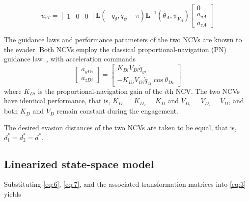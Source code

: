 \begin{equation}
\label{eq:8}
{u_{rT}} = \left[ {\begin{array}{*{20}{c}}
  1&0&0 
\end{array}} \right]{\mathbf{L}}( - {q_\theta },{q_\psi } - \pi ){{\mathbf{L}}^{ - 1}}({\theta _A},{\psi _{{V_A}}})\left[ {\begin{array}{*{20}{c}}
  0 \\ 
  {{a_{yA}}} \\ 
  {{a_{zA}}} 
\end{array}} \right]
\end{equation}
\begin{assumption}
\label{asm:ncv}
The guidance laws and performance parameters of the two NCVs are known to the evader. Both NCVs employ the classical proportional-navigation (PN) guidance law~\cite{murtaugh1966}, with acceleration commands
\begin{equation}
\label{eq:9}
\left[ {\begin{array}{*{20}{c}}
  {{a_{yDi}}} \\ 
  {{a_{zDi}}} 
\end{array}} \right] = \left[ {\begin{array}{*{20}{c}}
  {{K_{Di}}{V_{Di}}{{\dot q}_{yi}}} \\ 
  { - {K_{Di}}{V_{Di}}{{\dot q}_{zi}}\cos {\theta _{Di}}} 
\end{array}} \right]
\end{equation}
where ${K_{Di}}$ is the proportional-navigation gain of the $i$th NCV. The two NCVs have identical performance, that is, ${K_{{D_1}}} = {K_{{D_2}}} = {K_D}$ and ${V_{{D_1}}} = {V_{{D_2}}} = {V_D}$, and both ${K_D}$ and ${V_D}$ remain constant during the engagement.
\end{assumption}
The desired evasion distances of the two NCVs are taken to be equal, that is, $d_1^* = d_2^* = d^*$.
\subsection{Linearized state-space model}
Substituting \eqref{eq:6}, \eqref{eq:7}, and the associated transformation matrices into \eqref{eq:3} yields

